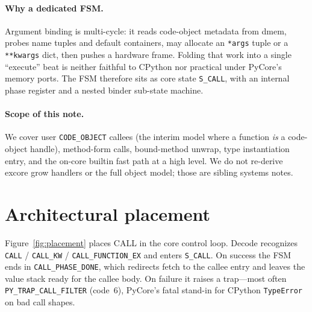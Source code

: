 \documentclass[11pt,a4paper]{article}
\begin{document}
\paragraph{Why a dedicated FSM.}
Argument binding is multi-cycle: it reads code-object metadata from dmem,
probes name tuples and default containers, may allocate an \texttt{*args} tuple
or a \texttt{**kwargs} dict, then pushes a hardware frame.
Folding that work into a single ``execute'' beat is neither faithful to CPython
nor practical under PyCore's memory ports.
The FSM therefore sits as core state \texttt{S\_CALL}, with an internal phase
register and a nested binder sub-state machine.

\paragraph{Scope of this note.}
We cover user \texttt{CODE\_OBJECT} callees (the interim model where a function
\emph{is} a code-object handle), method-form calls, bound-method unwrap, type
instantiation entry, and the on-core builtin fast path at a high level.
We do not re-derive excore grow handlers or the full object model; those are
sibling systems notes.

\section{Architectural placement}

Figure~\ref{fig:placement} places CALL in the core control loop.
Decode recognizes \texttt{CALL} / \texttt{CALL\_KW} / \texttt{CALL\_FUNCTION\_EX}
and enters \texttt{S\_CALL}.
On success the FSM ends in \texttt{CALL\_PHASE\_DONE}, which redirects fetch to
the callee entry and leaves the value stack ready for the callee body.
On failure it raises a trap---most often \texttt{PY\_TRAP\_CALL\_FILTER} (code~6),
PyCore's fatal stand-in for CPython \texttt{TypeError} on bad call shapes.
\end{document}
